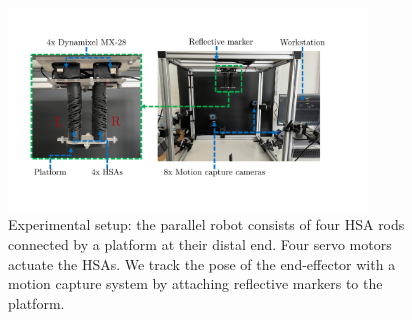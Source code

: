 \begin{figure}[t]
    \centering
    \includegraphics[width=0.85\textwidth]{hsacontrol/figures/experimental_setup_v2_cropped_compressed.pdf}
    \caption{Experimental setup: the parallel robot consists of four HSA rods connected by a platform at their distal end. Four servo motors actuate the HSAs. We track the pose of the end-effector with a motion capture system by attaching reflective markers to the platform.}
    \label{fig:hsacontrol:hsacontrol:experimental_setup}
\end{figure}

